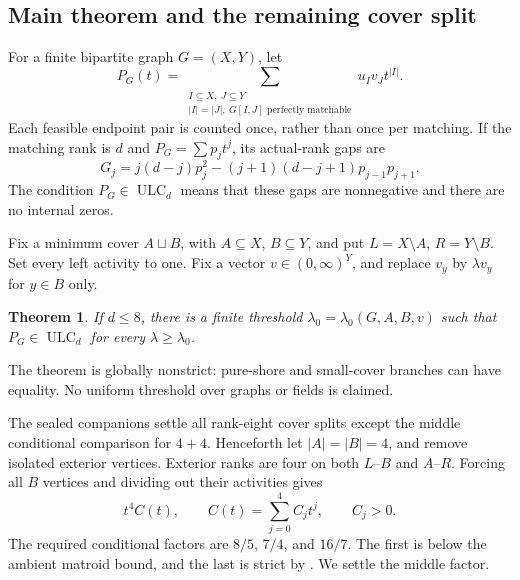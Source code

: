 \documentclass[11pt,a4paper]{article}
\newtheorem{theorem}{Theorem}[section]
\theoremstyle{remark}\newtheorem{remark}[theorem]{Remark}
\newcommand{\ULC}{\operatorname{ULC}}      %
\begin{document}
\subsection{Main theorem and the remaining cover split}
For a finite bipartite graph $G=(X,Y)$, let
\[
 P_G(t)=\sum_{\substack{I\subseteq X,\ J\subseteq Y\\|I|=|J|,\ G[I,J]\text{ perfectly matchable}}}u_Iv_Jt^{|I|}.
\]
Each feasible endpoint pair is counted once, rather than once per matching. If the matching rank is $d$ and $P_G=\sum p_jt^j$, its actual-rank gaps are
\begin{equation}\label{mrn:e:r8:eq:gaps}
 G_j=j(d-j)p_j^2-(j+1)(d-j+1)p_{j-1}p_{j+1}.
\end{equation}
The condition $P_G\in\ULC_d$ means that these gaps are nonnegative and there are no internal zeros.

Fix a minimum cover $A\sqcup B$, with $A\subseteq X$, $B\subseteq Y$, and put $L=X\setminus A$, $R=Y\setminus B$. Set every left activity to one. Fix a vector $v\in(0,\infty)^Y$, and replace $v_y$ by $\lambda v_y$ for $y\in B$ only.

\begin{theorem}\label{mrn:e:r8:thm:global}
If $d\le8$, there is a finite threshold $\lambda_0=\lambda_0(G,A,B,v)$ such that $P_G\in\ULC_d$ for every $\lambda\ge\lambda_0$.
\end{theorem}
The theorem is globally nonstrict: pure-shore and small-cover branches can have equality. No uniform threshold over graphs or fields is claimed.

The sealed companions \cite{b:m03,b:m02} settle all rank-eight cover splits except the middle conditional comparison for $4+4$. Henceforth let $|A|=|B|=4$, and remove isolated exterior vertices. Exterior ranks are four on both $L$--$B$ and $A$--$R$. Forcing all $B$ vertices and dividing out their activities gives
\[
 t^4C(t),\qquad C(t)=\sum_{j=0}^4C_jt^j,\qquad C_j>0.
\]
The required conditional factors are $8/5$, $7/4$, and $16/7$. The first is below the ambient matroid bound, and the last is strict by \cite{b:m02}. We settle the middle factor.
\end{document}
